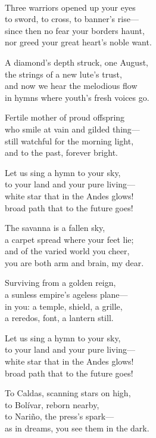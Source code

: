\begin{lyrics}

\\
Three warriors opened up your eyes\\
to sword, to cross, to banner’s rise—\\
since then no fear your borders haunt,\\
nor greed your great heart’s noble want.

A diamond’s depth struck, one August,\\
the strings of a new lute’s trust,\\
and now we hear the melodious flow\\
in hymns where youth’s fresh voices go.

Fertile mother of proud offspring\\
who smile at vain and gilded thing—\\
still watchful for the morning light,\\
and to the past, forever bright.

Let us sing a hymn to your sky,\\
to your land and your pure living—\\
white star that in the Andes glows!\\
broad path that to the future goes!

The savanna is a fallen sky,\\
a carpet spread where your feet lie;\\
and of the varied world you cheer,\\
you are both arm and brain, my dear.

Surviving from a golden reign,\\
a sunless empire’s ageless plane—\\
in you: a temple, shield, a grille,\\
a reredos, font, a lantern still.

Let us sing a hymn to your sky,\\
to your land and your pure living—\\
white star that in the Andes glows!\\
broad path that to the future goes!

To Caldas, scanning stars on high,\\
to Bolívar, reborn nearby,\\
to Nariño, the press’s spark—\\
as in dreams, you see them in the dark.


\end{lyrics}
